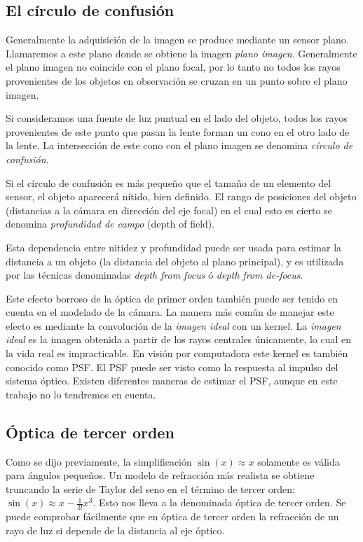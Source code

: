 \subsection{El círculo de confusión}
Generalmente la adquisición de la imagen se produce mediante un sensor plano. Llamaremos a este plano donde se obtiene la imagen \emph{plano imagen}. Generalmente el plano imagen no coincide con el plano focal, por lo tanto no todos los rayos provenientes de los objetos en observación se cruzan en un punto sobre el plano imagen.

Si consideramos una fuente de luz puntual en el lado del objeto, todos los rayos provenientes de este punto que pasan la lente forman un cono en el otro lado de la lente. La intersección de este cono con el plano imagen se denomina \emph{círculo de confusión}.

Si el círculo de confusión es más pequeño que el tamaño de un elemento del sensor, el objeto aparecerá nítido, bien definido. El rango de posiciones del objeto (distancias a la cámara en dirección del eje focal) en el cual esto es cierto se denomina \emph{profundidad de campo} (depth of field).

Esta dependencia entre nitidez y profundidad puede ser usada para estimar la distancia a un objeto (la distancia del objeto al plano principal), y es utilizada por las técnicas denominadas \emph{depth from focus} ó \emph{depth from de-focus}.

Este efecto borroso de la óptica de primer orden también puede ser tenido en cuenta en el modelado de la cámara. La manera más común de manejar este efecto es mediante la convolución de la \emph{imagen ideal} con un kernel. La \emph{imagen ideal} es la imagen obtenida a partir de los rayos centrales únicamente, lo cual en la vida real es impracticable. En visión por computadora este kernel es también conocido como \ac{PSF}. El \ac{PSF} puede ser visto como la respuesta al impulso del sistema óptico. Existen diferentes maneras de estimar el \ac{PSF}, aunque en este trabajo no lo tendremos en cuenta.

\subsection{Óptica de tercer orden}
Como se dijo previamente, la simplificación $\sin(x) \approx x$ solamente es válida para ángulos pequeños. Un modelo de refracción más realista se obtiene truncando la serie de Taylor del seno en el término de tercer orden: $\sin(x) \approx x - \frac{1}{3!} x^3$. Esto nos lleva a la denominada óptica de tercer orden. Se puede comprobar fácilmente que en óptica de tercer orden la refracción de un rayo de luz si depende de la distancia al eje óptico.

